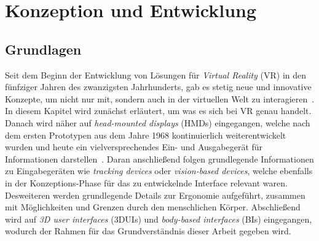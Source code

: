 \section{Konzeption und Entwicklung}

\subsection{Grundlagen}
Seit dem Beginn der Entwicklung von Lösungen für \textit{Virtual Reality} (VR) in den fünfziger Jahren des zwanzigsten Jahrhunderts, gab es stetig neue und innovative Konzepte, um nicht nur mit, sondern auch in der virtuellen Welt zu interagieren~\cite{virtualreality}. In diesem Kapitel wird zunächst erläutert, um was es sich bei VR genau handelt. Danach wird näher auf \textit{head-mounted displays} (HMDs) eingegangen, welche nach dem ersten Prototypen aus dem Jahre 1968 kontinuierlich weiterentwickelt wurden und heute ein vielversprechendes Ein- und Ausgabegerät für Informationen darstellen~\cite{vrfuture}. Daran anschließend folgen grundlegende Informationen zu Eingabegeräten wie \textit{tracking devices} oder \textit{vision-based devices}, welche ebenfalls in der Konzeptions-Phase für das zu entwickelnde Interface relevant waren. Desweiteren werden grundlegende Details zur Ergonomie aufgeführt, zusammen mit Möglichkeiten und Grenzen durch den menschlichen Körper. Abschließend wird auf \textit{3D user interfaces} (3DUIs) und \textit{body-based interfaces} (BIs) eingegangen, wodurch der Rahmen für das Grundverständnis dieser Arbeit gegeben wird.

